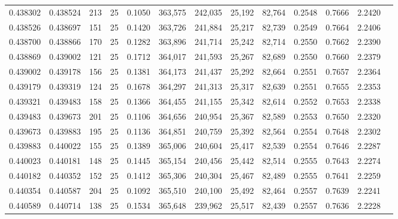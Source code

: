 \begin{tabular}{rrrrrrrrrrrrr}
0.438302 & 0.438524 &   213 &  25 &                                     0.1050 & 363,575 & 242,035 &  25,192 &  82,764 & 0.2548 & 0.7666 & 2.2420 \\
0.438526 & 0.438697 &   151 &  25 &                                     0.1420 & 363,726 & 241,884 &  25,217 &  82,739 & 0.2549 & 0.7664 & 2.2406 \\
0.438700 & 0.438866 &   170 &  25 &                                     0.1282 & 363,896 & 241,714 &  25,242 &  82,714 & 0.2550 & 0.7662 & 2.2390 \\
0.438869 & 0.439002 &   121 &  25 &                                     0.1712 & 364,017 & 241,593 &  25,267 &  82,689 & 0.2550 & 0.7660 & 2.2379 \\
0.439002 & 0.439178 &   156 &  25 &                                     0.1381 & 364,173 & 241,437 &  25,292 &  82,664 & 0.2551 & 0.7657 & 2.2364 \\
0.439179 & 0.439319 &   124 &  25 &                                     0.1678 & 364,297 & 241,313 &  25,317 &  82,639 & 0.2551 & 0.7655 & 2.2353 \\
0.439321 & 0.439483 &   158 &  25 &                                     0.1366 & 364,455 & 241,155 &  25,342 &  82,614 & 0.2552 & 0.7653 & 2.2338 \\
0.439483 & 0.439673 &   201 &  25 &                                     0.1106 & 364,656 & 240,954 &  25,367 &  82,589 & 0.2553 & 0.7650 & 2.2320 \\
0.439673 & 0.439883 &   195 &  25 &                                     0.1136 & 364,851 & 240,759 &  25,392 &  82,564 & 0.2554 & 0.7648 & 2.2302 \\
0.439883 & 0.440022 &   155 &  25 &                                     0.1389 & 365,006 & 240,604 &  25,417 &  82,539 & 0.2554 & 0.7646 & 2.2287 \\
0.440023 & 0.440181 &   148 &  25 &                                     0.1445 & 365,154 & 240,456 &  25,442 &  82,514 & 0.2555 & 0.7643 & 2.2274 \\
0.440182 & 0.440352 &   152 &  25 &                                     0.1412 & 365,306 & 240,304 &  25,467 &  82,489 & 0.2555 & 0.7641 & 2.2259 \\
0.440354 & 0.440587 &   204 &  25 &                                     0.1092 & 365,510 & 240,100 &  25,492 &  82,464 & 0.2557 & 0.7639 & 2.2241 \\
0.440589 & 0.440714 &   138 &  25 &                                     0.1534 & 365,648 & 239,962 &  25,517 &  82,439 & 0.2557 & 0.7636 & 2.2228 \\

\end{tabular}
